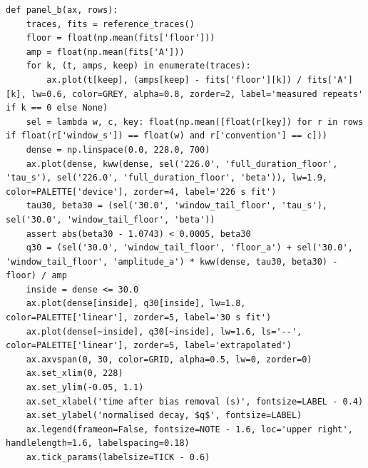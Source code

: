 \documentclass[a4paper,10pt]{article}
\begin{document}
\begin{Verbatim}
def panel_b(ax, rows):
    traces, fits = reference_traces()
    floor = float(np.mean(fits['floor']))
    amp = float(np.mean(fits['A']))
    for k, (t, amps, keep) in enumerate(traces):
        ax.plot(t[keep], (amps[keep] - fits['floor'][k]) / fits['A'][k], lw=0.6, color=GREY, alpha=0.8, zorder=2, label='measured repeats' if k == 0 else None)
    sel = lambda w, c, key: float(np.mean([float(r[key]) for r in rows if float(r['window_s']) == float(w) and r['convention'] == c]))
    dense = np.linspace(0.0, 228.0, 700)
    ax.plot(dense, kww(dense, sel('226.0', 'full_duration_floor', 'tau_s'), sel('226.0', 'full_duration_floor', 'beta')), lw=1.9, color=PALETTE['device'], zorder=4, label='226 s fit')
    tau30, beta30 = (sel('30.0', 'window_tail_floor', 'tau_s'), sel('30.0', 'window_tail_floor', 'beta'))
    assert abs(beta30 - 1.0743) < 0.0005, beta30
    q30 = (sel('30.0', 'window_tail_floor', 'floor_a') + sel('30.0', 'window_tail_floor', 'amplitude_a') * kww(dense, tau30, beta30) - floor) / amp
    inside = dense <= 30.0
    ax.plot(dense[inside], q30[inside], lw=1.8, color=PALETTE['linear'], zorder=5, label='30 s fit')
    ax.plot(dense[~inside], q30[~inside], lw=1.6, ls='--', color=PALETTE['linear'], zorder=5, label='extrapolated')
    ax.axvspan(0, 30, color=GRID, alpha=0.5, lw=0, zorder=0)
    ax.set_xlim(0, 228)
    ax.set_ylim(-0.05, 1.1)
    ax.set_xlabel('time after bias removal (s)', fontsize=LABEL - 0.4)
    ax.set_ylabel('normalised decay, $q$', fontsize=LABEL)
    ax.legend(frameon=False, fontsize=NOTE - 1.6, loc='upper right', handlelength=1.6, labelspacing=0.18)
    ax.tick_params(labelsize=TICK - 0.6)


\end{Verbatim}
\end{document}
